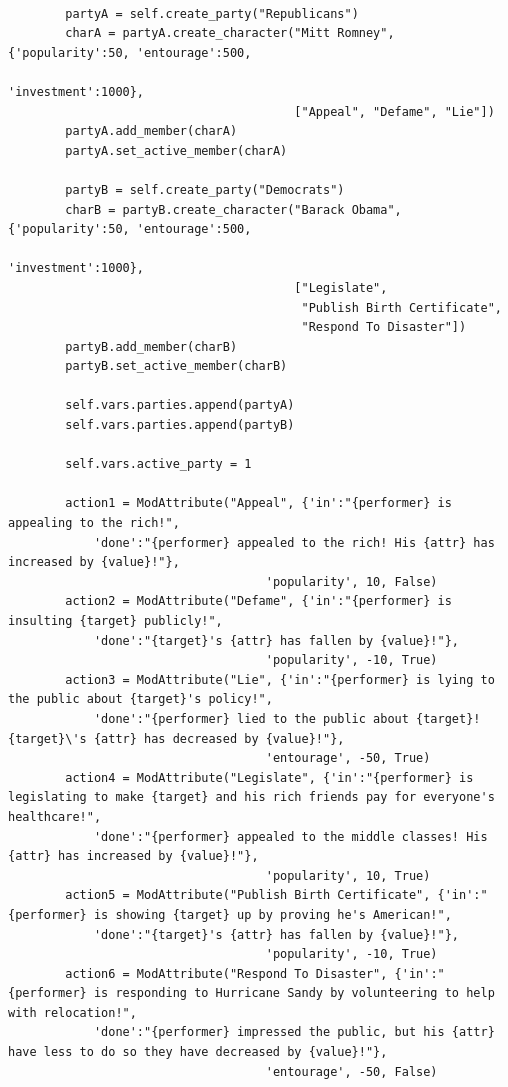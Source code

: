 \documentclass[11pt]{report}
\begin{document}
\begin{verbatim}
        
        partyA = self.create_party("Republicans")
        charA = partyA.create_character("Mitt Romney", {'popularity':50, 'entourage':500,
                                                        'investment':1000},
                                        ["Appeal", "Defame", "Lie"])
        partyA.add_member(charA)
        partyA.set_active_member(charA)
        
        partyB = self.create_party("Democrats")
        charB = partyB.create_character("Barack Obama", {'popularity':50, 'entourage':500,
                                                         'investment':1000},
                                        ["Legislate", 
                                         "Publish Birth Certificate", 
                                         "Respond To Disaster"])
        partyB.add_member(charB)
        partyB.set_active_member(charB)
        
        self.vars.parties.append(partyA)
        self.vars.parties.append(partyB)

        self.vars.active_party = 1
        
        action1 = ModAttribute("Appeal", {'in':"{performer} is appealing to the rich!", 
            'done':"{performer} appealed to the rich! His {attr} has increased by {value}!"}, 
                                    'popularity', 10, False)
        action2 = ModAttribute("Defame", {'in':"{performer} is insulting {target} publicly!", 
            'done':"{target}'s {attr} has fallen by {value}!"}, 
                                    'popularity', -10, True)
        action3 = ModAttribute("Lie", {'in':"{performer} is lying to the public about {target}'s policy!", 
            'done':"{performer} lied to the public about {target}! {target}\'s {attr} has decreased by {value}!"}, 
                                    'entourage', -50, True)
        action4 = ModAttribute("Legislate", {'in':"{performer} is legislating to make {target} and his rich friends pay for everyone's healthcare!", 
            'done':"{performer} appealed to the middle classes! His {attr} has increased by {value}!"}, 
                                    'popularity', 10, True)
        action5 = ModAttribute("Publish Birth Certificate", {'in':"{performer} is showing {target} up by proving he's American!", 
            'done':"{target}'s {attr} has fallen by {value}!"}, 
                                    'popularity', -10, True)
        action6 = ModAttribute("Respond To Disaster", {'in':"{performer} is responding to Hurricane Sandy by volunteering to help with relocation!", 
            'done':"{performer} impressed the public, but his {attr} have less to do so they have decreased by {value}!"}, 
                                    'entourage', -50, False)
        

\end{verbatim}
\end{document}
